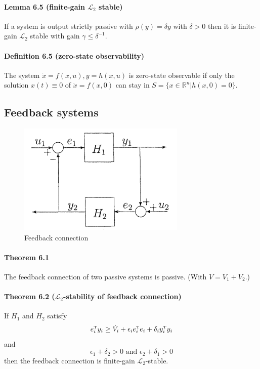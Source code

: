 \paragraph{Lemma 6.5 (finite-gain $\mathcal{L}_2$ stable)}
If a system is output strictly passive with $\rho(y) = \delta y$ with $\delta > 0$ then it is finite-gain $\mathcal{L}_2$ stable with gain $\gamma \leq \delta^{-1}$.

\paragraph{Definition 6.5 (zero-state observability)}
The system $\dot{x} = f(x,u), y = h(x,u)$ is zero-state observable if only the solution $x(t) \equiv 0$ of $\dot{x} = f(x,0)$ can stay in $S = \{ x \in \mathbb{R}^n | h(x,0) = 0 \}$.

\subsection{Feedback systems}
\begin{figure}[htbp]
	\centering
	\includegraphics[width=8cm]{feedback-connection.png}
	\caption{Feedback connection}
\end{figure}

\paragraph{Theorem 6.1}
The feedback connection of two passive systems is passive. (With $V = V_1 + V_2$.)

\paragraph{Theorem 6.2 ($\mathcal{L}_2$-stability of feedback connection)}
If $H_1$ and $H_2$ satisfy
\begin{equation}
	e_i^{\scriptscriptstyle \mathrm{T}} y_i \geq \dot{V}_i + \epsilon_i e_i^{\scriptscriptstyle \mathrm{T}} e_i + \delta_i y_i^{\scriptscriptstyle \mathrm{T}} y_i
\end{equation}
and
\begin{equation}
	\epsilon_1 + \delta_2 > 0 \mbox{ and } \epsilon_2 + \delta_1 > 0
\end{equation}
then the feedback connection is finite-gain $\mathcal{L}_2$-stable.
